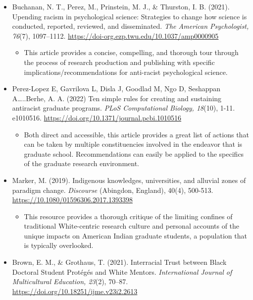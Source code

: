 \documentclass[
  11pt,
]{book}
\providecommand{\tightlist}{%
  \setlength{\itemsep}{0pt}\setlength{\parskip}{0pt}}
\begin{document}
\begin{itemize}
\tightlist
\item
  Buchanan, N. T., Perez, M., Prinstein, M. J., \& Thurston, I. B. (2021). Upending racism in psychological science: Strategies to change how science is conducted, reported, reviewed, and disseminated. \emph{The American Psychologist, 76}(7), 1097--1112. \url{https://doi-org.ezp.twu.edu/10.1037/amp0000905}

  \begin{itemize}
  \tightlist
  \item
    This article provides a concise, compelling, and thorough tour through the process of research production and publishing with specific implications/recommendations for anti-racist psychological science.
  \end{itemize}
\item
  Perez-Lopez E, Gavrilova L, Disla J, Goodlad M, Ngo D, Seshappan A\ldots..Berhe, A. A. (2022) Ten simple rules for creating and sustaining antiracist graduate programs. \emph{PLoS Computational Biology, 18}(10), 1-11. e1010516. \url{https://doi.org/10.1371/journal.pcbi.1010516}

  \begin{itemize}
  \tightlist
  \item
    Both direct and accessible, this article provides a great list of actions that can be taken by multiple constituencies involved in the endeavor that is graduate school. Recommendations can easily be applied to the specifics of the graduate research environment.\\
  \end{itemize}
\item
  Marker, M. (2019). Indigenous knowledges, universities, and alluvial zones of paradigm change. \emph{Discourse} (Abingdon, England), 40(4), 500-513. \url{https://10.1080/01596306.2017.1393398}

  \begin{itemize}
  \tightlist
  \item
    This resource provides a thorough critique of the limiting confines of traditional White-centric research culture and personal accounts of the unique impacts on American Indian graduate students, a population that is typically overlooked.
  \end{itemize}
\item
  Brown, E. M., \& Grothaus, T. (2021). Interracial Trust between Black Doctoral Student Protégés and White Mentors. \emph{International Journal of Multicultural Education, 23}(2), 70--87. \url{https://doi.org/10.18251/ijme.v23i2.2613}
\end{itemize}
\end{document}
